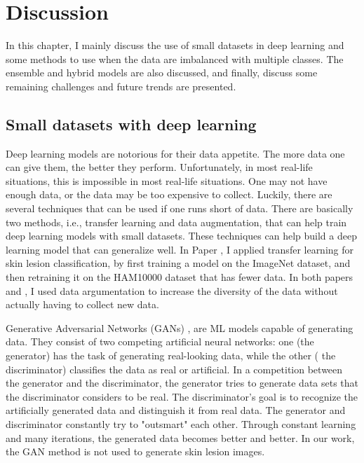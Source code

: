 \chapter{Discussion} \label{ch:results}

In this chapter, I mainly discuss the use of small datasets in deep learning and some methods to use when the data are imbalanced with multiple classes. The ensemble and hybrid models are also discussed, and finally, discuss some remaining challenges and future trends are presented.

\section{Small datasets with deep learning}
Deep learning models are notorious for their data appetite. The more data one can give them, the better they perform. Unfortunately, in most real-life situations, this is impossible in most real-life situations. One may not have enough data, or the data may be too expensive to collect. Luckily, there are several techniques that can be used if one runs short of data. There are basically two methods, i.e., transfer learning and data augmentation, that can help train deep learning models with small datasets. These techniques can help build a deep learning model that can generalize well. In Paper \uppercase\expandafter{}, I applied transfer learning for skin lesion classification, by first training a model on the ImageNet dataset, and then retraining it on the HAM10000 dataset that has fewer data. In both papers \uppercase\expandafter{} and \uppercase\expandafter{}, I  used data argumentation to increase the diversity of the data without actually having to collect new data.

Generative Adversarial Networks (GANs) \cite{goodfellow2020generative}, are ML models capable of generating data. They consist of two competing artificial neural networks: one (the generator) has the task of generating real-looking data, while the other ( the discriminator) classifies the data as real or artificial. In a competition between the generator and the discriminator, the generator tries to generate data sets that the discriminator considers to be real. The discriminator's goal is to recognize the artificially generated data and distinguish it from real data. The generator and discriminator constantly try to "outsmart" each other. Through constant learning and many iterations, the generated data becomes better and better. In our work, the GAN method is not used to generate skin lesion images. 

